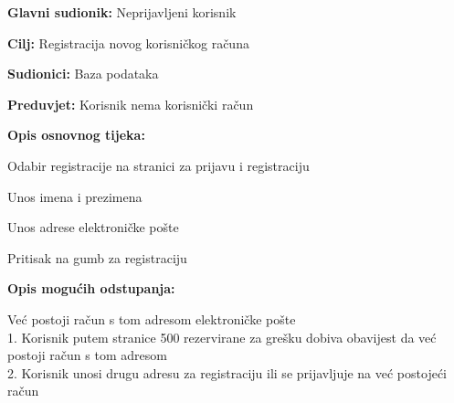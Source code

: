 					
					\noindent {}
					\begin{packed_item}
						\item \textbf{Glavni sudionik:} Neprijavljeni korisnik
						\item \textbf{Cilj:} Registracija novog korisničkog računa
						\item \textbf{Sudionici:} Baza podataka
						\item \textbf{Preduvjet:} Korisnik nema korisnički račun
						\item \textbf{Opis osnovnog tijeka:}
						\begin{packed_enum}
							\item Odabir registracije na stranici za prijavu i registraciju
							\item Unos imena i prezimena
							\item Unos adrese elektroničke pošte
							\item Pritisak na gumb za registraciju
						\end{packed_enum}
						\item \textbf{Opis mogućih odstupanja:}
						\begin{packed_item}
							\item[3.a] Već postoji račun s tom adresom elektroničke pošte
							\\1. Korisnik putem stranice 500 rezervirane za grešku dobiva obavijest  da već postoji račun s tom adresom
							\\2. Korisnik unosi drugu adresu za registraciju ili se prijavljuje na već postojeći račun
						\end{packed_item}
					\end{packed_item}
					
